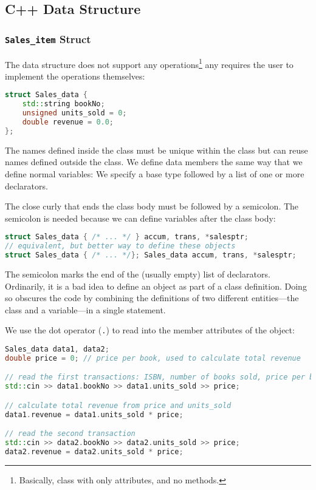 \subsection{C++ Data Structure}
\label{task:20231123_cpp}

\subsubsection{\texttt{Sales_item} Struct}

The data structure does not support any operations\footnote{Basically, class with only attributes, and no methods.} any requires the user to implement the operations themselves:
\begin{lstlisting}[language=C++]
struct Sales_data { 
    std::string bookNo; 
    unsigned units_sold = 0; 
    double revenue = 0.0; 
};
\end{lstlisting}
The names defined inside the class must be unique within the class but can reuse names defined outside the class. We define data members the same way that we define normal variables: We specify a base type followed by a list of one or more declarators.

The close curly that ends the class body must be followed by a semicolon. The semicolon is needed because we can define variables after the class body:
\begin{lstlisting}[language=C++]
struct Sales_data { /* ... */ } accum, trans, *salesptr; 
// equivalent, but better way to define these objects 
struct Sales_data { /* ... */}; Sales_data accum, trans, *salesptr;
\end{lstlisting}
The semicolon marks the end of the (usually empty) list of declarators. Ordinarily, it is a bad idea to define an object as part of a class definition. Doing so obscures the code by combining the definitions of two different entities—the class and a variable—in a single statement.

We use the dot operator (\texttt{.}) to read into the member attributes of the object:
\begin{lstlisting}[language=C++]
Sales_data data1, data2;
double price = 0; // price per book, used to calculate total revenue 

// read the first transactions: ISBN, number of books sold, price per book 
std::cin >> data1.bookNo >> data1.units_sold >> price; 

// calculate total revenue from price and units_sold 
data1.revenue = data1.units_sold * price;

// read the second transaction 
std::cin >> data2.bookNo >> data2.units_sold >> price; 
data2.revenue = data2.units_sold * price;
\end{lstlisting}

